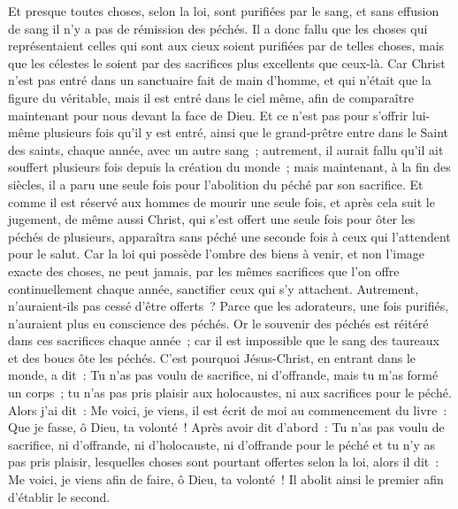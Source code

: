 \begin{multicols}{2}
Et presque toutes choses, selon la loi, sont purifiées par le sang, et sans effusion de sang il n'y a pas de rémission des péchés.
Il a donc fallu que les choses qui représentaient celles qui sont aux cieux soient purifiées par de telles choses, mais que les célestes le soient par des sacrifices plus excellents que ceux-là.
Car Christ n'est pas entré dans un sanctuaire fait de main d'homme, et qui n'était que la figure du véritable, mais il est entré dans le ciel même, afin de comparaître maintenant pour nous devant la face de Dieu.
Et ce n'est pas pour s'offrir lui-même plusieurs fois qu'il y est entré, ainsi que le grand-prêtre entre dans le Saint des saints, chaque année, avec un autre sang~;
autrement, il aurait fallu qu'il ait souffert plusieurs fois depuis la création du monde~; mais maintenant, à la fin des siècles, il a paru une seule fois pour l'abolition du péché par son sacrifice.
Et comme il est réservé aux hommes de mourir une seule fois, et après cela suit le jugement,
de même aussi Christ, qui s'est offert une seule fois pour ôter les péchés de plusieurs, apparaîtra sans péché une seconde fois à ceux qui l'attendent pour le salut.
\VerseOne{}Car la loi qui possède l'ombre des biens à venir, et non l'image exacte des choses, ne peut jamais, par les mêmes sacrifices que l'on offre continuellement chaque année, sanctifier ceux qui s'y attachent.
Autrement, n'auraient-ils pas cessé d'être offerts~? Parce que les adorateurs, une fois purifiés, n'auraient plus eu conscience des péchés.
Or le souvenir des péchés est réitéré dans ces sacrifices chaque année~;
car il est impossible que le sang des taureaux et des boucs ôte les péchés.
C'est pourquoi Jésus-Christ, en entrant dans le monde, a dit~: Tu n'as pas voulu de sacrifice, ni d'offrande, mais tu m'as formé un corps~;
tu n'as pas pris plaisir aux holocaustes, ni aux sacrifices pour le péché.
Alors j'ai dit~: Me voici, je viens, il est écrit de moi au commencement du livre~: Que je fasse, ô Dieu, ta volonté~!
Après avoir dit d'abord~: Tu n'as pas voulu de sacrifice, ni d'offrande, ni d'holocauste, ni d'offrande pour le péché et tu n'y as pas pris plaisir, lesquelles choses sont pourtant offertes selon la loi, alors il dit~: Me voici, je viens afin de faire, ô Dieu, ta volonté~!
Il abolit ainsi le premier afin d'établir le second.

\end{multicols}
